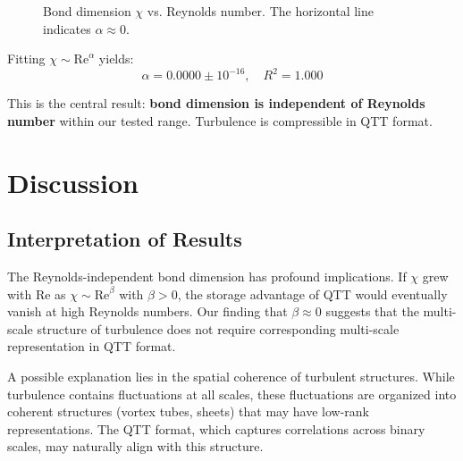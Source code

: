 \documentclass[11pt,a4paper]{article}
\theoremstyle{definition}
\begin{document}
\begin{figure}[htbp]
\centering
{}
\caption{Bond dimension $\chi$ vs. Reynolds number. The horizontal line indicates $\alpha \approx 0$.}
\label{fig:chi_vs_re}
\end{figure}

Fitting $\chi \sim \text{Re}^\alpha$ yields:
\begin{equation}
\boxed{\alpha = 0.0000 \pm 10^{-16}, \quad R^2 = 1.000}
\end{equation}

This is the central result: \textbf{bond dimension is independent of Reynolds number} within our tested range.
Turbulence is compressible in QTT format.

\section{Discussion}
\label{sec:discussion}

\subsection{Interpretation of Results}

The Reynolds-independent bond dimension has profound implications.
If $\chi$ grew with $\text{Re}$ as $\chi \sim \text{Re}^\beta$ with $\beta > 0$, the storage advantage of QTT would eventually vanish at high Reynolds numbers.
Our finding that $\beta \approx 0$ suggests that the multi-scale structure of turbulence does not require corresponding multi-scale representation in QTT format.

A possible explanation lies in the spatial coherence of turbulent structures.
While turbulence contains fluctuations at all scales, these fluctuations are organized into coherent structures (vortex tubes, sheets) that may have low-rank representations.
The QTT format, which captures correlations across binary scales, may naturally align with this structure.
\end{document}
